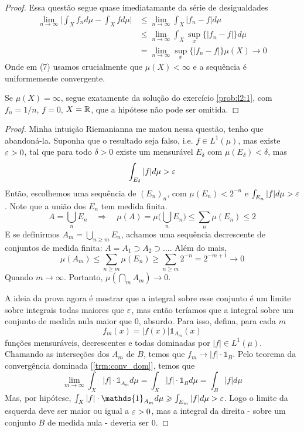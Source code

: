 \begin{problem}
    \label{prob:l2:4}
\end{problem}

\begin{proof}
    Essa questão segue quase imediatamante da série de desigualdades
    \begin{align}
        \lim_{n\to\infty} \bigg|\int_X f_n d\mu - \int_Xfd\mu \bigg| &\leq \lim_{n\to\infty} \int_X |f_n - f| d\mu\\
        &\leq \lim_{n\to\infty} \int_X \sup_x\{|f_n - f|\}d\mu\\
        &= \lim_{n\to\infty} \sup_x\{|f_n - f|\} \mu(X) \to 0
    \end{align}
    Onde em (7) usamos crucialmente que $\mu(X) < \infty$ e a sequência é uniformemente convergente.

    Se $\mu(X) = \infty$, segue exatamente da solução do exercício \ref{prob:l2:1}, com $f_n = 1/n$, $f = 0$, $X = \mathbb{R}$, que a hipótese não pode ser omitida.
\end{proof}

\begin{problem}
    \label{prob:l2:5}
\end{problem}

\begin{proof}
    Minha intuição Riemanianna me matou nessa questão, tenho que abandoná-la. Suponha que o resultado seja falso, i.e. $f \in L^1(\mu)$, mas existe $\varepsilon > 0$, tal que 
    para todo $\delta > 0$ existe um mensurável $E_\delta$ com $\mu(E_\delta) < \delta$, mas 
    $$\int_{E_\delta} |f| d\mu > \varepsilon$$
    Então, escolhemos uma sequência de $(E_n)_n$, com $\mu(E_n) < 2^{-n}$ e $\int_{E_n} |f| d\mu > \varepsilon$. Note que a união dos $E_n$ tem medida finita.
    $$A = \bigcup_n E_n \quad \Rightarrow \quad \mu(A) = \mu \big(\bigcup_n E_n \big) \leq \sum_n \mu(E_n) \leq 2$$
    E se definirmos $A_m = \bigcup_{n\geq m} E_n$, achamos uma sequência decrescente de conjuntos de medida finita: $A = A_1 \supset A_2 \supset \dots$.
    Além do mais,
    $$\mu(A_m) \leq \sum_{n \geq m} \mu(E_n) \geq \sum_{n \geq m} 2^{-n} = 2^{-m + 1} \to 0$$
    Quando $m \to \infty$. Portanto, $\mu(\bigcap_m A_m) \to 0$.

    A ideia da prova agora é mostrar que a integral sobre esse conjunto é um limite sobre integrais todas maiores que $\varepsilon$, mas então teríamos
    que a integral sobre um conjunto de medida nula maior que $0$, absurdo. Para isso, defina, para cada $m$
    $$f_m(x) = |f(x)| \mathds{1}_{A_m}(x)$$
    funções mensuráveis, decrescentes e todas dominadas por $|f| \in L^1(\mu)$. Chamando as interseções dos $A_m$ de $B$,
    temos que $f_m \to |f| \cdot \mathds{1}_B$. Pelo teorema da convergência dominada [\ref{trm:conv_dom}], temos que 
    $$\lim_{m\to\infty} \int_X |f|\cdot \mathds{1}_{A_m} d\mu = \int_X |f| \cdot \mathds{1}_B d\mu = \int_B |f| d\mu$$
    Mas, por hipótese, $\int_X |f|\cdot \mathds{1}_{A_m} d\mu \geq \int_{E_m} |f| d\mu > \eps$. Logo o limite da esquerda deve ser maior ou igual a $\varepsilon > 0$,
    mas a integral da direita - sobre um conjunto $B$ de medida nula - deveria ser $0$.
\end{proof}

